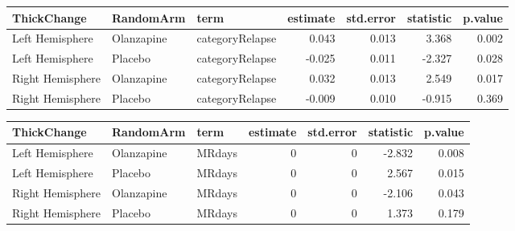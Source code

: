 \documentclass[]{article}
\newenvironment{Shaded}{\begin{snugshade}}{\end{snugshade}}
\newcommand{\KeywordTok}[1]{\textcolor[rgb]{0.13,0.29,0.53}{\textbf{#1}}}
\newcommand{\DataTypeTok}[1]{\textcolor[rgb]{0.13,0.29,0.53}{#1}}
\newcommand{\DecValTok}[1]{\textcolor[rgb]{0.00,0.00,0.81}{#1}}
\newcommand{\StringTok}[1]{\textcolor[rgb]{0.31,0.60,0.02}{#1}}
\newcommand{\OperatorTok}[1]{\textcolor[rgb]{0.81,0.36,0.00}{\textbf{#1}}}
\newcommand{\NormalTok}[1]{#1}
\theoremstyle{definition}
\theoremstyle{definition}
\theoremstyle{definition}
\theoremstyle{remark}
\begin{document}
\begin{tabular}{l|l|l|r|r|r|r}
\hline
ThickChange & RandomArm & term & estimate & std.error & statistic & p.value\\
\hline
Left Hemisphere & Olanzapine & categoryRelapse & 0.043 & 0.013 & 3.368 & 0.002\\
\hline
Left Hemisphere & Placebo & categoryRelapse & -0.025 & 0.011 & -2.327 & 0.028\\
\hline
Right Hemisphere & Olanzapine & categoryRelapse & 0.032 & 0.013 & 2.549 & 0.017\\
\hline
Right Hemisphere & Placebo & categoryRelapse & -0.009 & 0.010 & -0.915 & 0.369\\
\hline
\end{tabular}

\begin{Shaded}
\end{Shaded}

\begin{tabular}{l|l|l|r|r|r|r}
\hline
ThickChange & RandomArm & term & estimate & std.error & statistic & p.value\\
\hline
Left Hemisphere & Olanzapine & MRdays & 0 & 0 & -2.832 & 0.008\\
\hline
Left Hemisphere & Placebo & MRdays & 0 & 0 & 2.567 & 0.015\\
\hline
Right Hemisphere & Olanzapine & MRdays & 0 & 0 & -2.106 & 0.043\\
\hline
Right Hemisphere & Placebo & MRdays & 0 & 0 & 1.373 & 0.179\\
\hline
\end{tabular}
\end{document}
